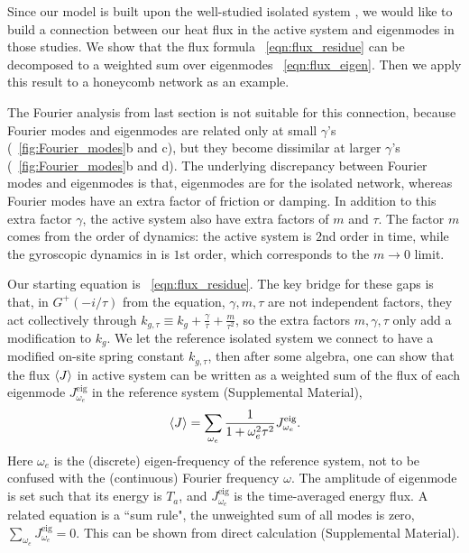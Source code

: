 \documentclass[
 preprint,
 preprintnumbers,
 amsmath,amssymb,
 aps,
 pre,
 longbibliography,
 10pt, twocolumn
]{revtex4-1}
\begin{document}
Since our model is built upon the well-studied isolated system \cite{Nash2015TopologicalMetamaterials,Susstrunk2016ClassificationMetamaterials,Mitchell2018AmorphousSets,Lee2018TopologicalLaws}, we would like to build a connection between our heat flux in the active system and eigenmodes in those studies. We show that the flux formula \eqnname~\eqref{eqn:flux_residue} can be decomposed to a weighted sum over eigenmodes \eqnname~\eqref{eqn:flux_eigen}. Then we apply this result to a honeycomb network as an example.

The Fourier analysis from last section is not suitable for this connection, because Fourier modes and eigenmodes are related only at small $\gamma$'s (\figurename~\ref{fig:Fourier_modes}b and c), but they become dissimilar at larger $\gamma$'s (\figurename~\ref{fig:Fourier_modes}b and d).
The underlying discrepancy between Fourier modes and eigenmodes is that, eigenmodes are for the isolated network, whereas Fourier modes have an extra factor of friction or damping.
In addition to this extra factor $\gamma$, 
the active system also have extra factors of $m$ and $\tau$. The factor $m$ comes from the order of dynamics: the active system is $2$nd order in time, while the gyroscopic dynamics in \cite{Nash2015TopologicalMetamaterials} is $1$st order, which corresponds to the $m\rightarrow 0$ limit.

Our starting equation is \eqnname~\eqref{eqn:flux_residue}. The key bridge for these gaps is that, in $G^+(-i/\tau)$ from the equation, $\gamma,m,\tau$ are not independent factors, they act collectively through $k_{g,\tau} \equiv k_g+\frac{\gamma}{\tau}+\frac{m}{\tau^2}$, so the extra factors $m,\gamma, \tau$ only add a modification to $k_g$. 
We let the reference isolated system we connect to have a modified on-site spring constant $k_{g,\tau}$, then after some algebra, one can show that the flux $\expval{J}$ in active system can be written as a weighted sum of the flux of each eigenmode $J^{\text{eig}}_{\omega_e}$ in the reference system (Supplemental Material),
\begin{equation} \label{eqn:flux_eigen}
\expval{J} = \sum_{\omega_e} \frac{1}{1+\omega_e^2\tau^2} J^{\text{eig}}_{\omega_e}.
\end{equation}
Here $\omega_e$ is the (discrete) eigen-frequency of the reference system, not to be confused with the (continuous) Fourier frequency $\omega$. The amplitude of eigenmode is set such that its energy is $T_a$, and $J^{\text{eig}}_{\omega_e}$ is the time-averaged energy flux.
A related equation is a ``sum rule", the unweighted sum of all modes is zero, $\sum_{\omega_e} J^{\text{eig}}_{\omega_e} = 0$. This can be shown from direct calculation (Supplemental Material).
\end{document}

